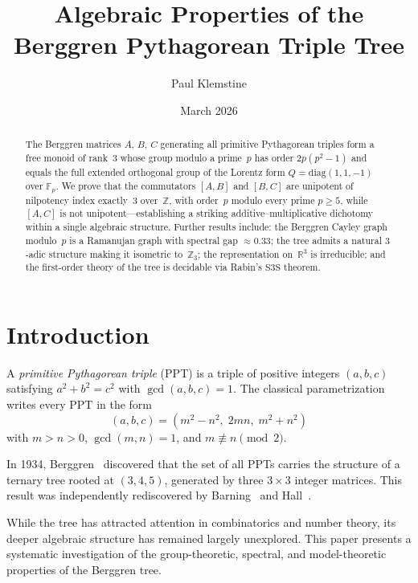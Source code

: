 \documentclass[12pt]{amsart}
\title{Algebraic Properties of the Berggren Pythagorean Triple Tree}
\author{Paul Klemstine}
\date{March 2026}
\theoremstyle{definition}
\theoremstyle{remark}
\begin{document}
\begin{abstract}
The Berggren matrices $A$, $B$, $C$ generating all primitive Pythagorean
triples form a free monoid of rank~3 whose group modulo a prime~$p$ has
order $2p(p^2-1)$ and equals the full extended orthogonal group of the
Lorentz form $Q = \mathrm{diag}(1,1,-1)$ over $\mathbb{F}_p$.
We prove that the commutators $[A,B]$ and $[B,C]$ are
unipotent of nilpotency index exactly~3 over~$\mathbb{Z}$, with order~$p$
modulo every prime $p \ge 5$, while $[A,C]$ is not unipotent---establishing
a striking additive--multiplicative dichotomy within a single algebraic
structure. Further results include: the Berggren Cayley graph modulo~$p$
is a Ramanujan graph with spectral gap $\approx 0.33$; the tree admits a
natural $3$-adic structure making it isometric to~$\mathbb{Z}_3$; the
representation on~$\mathbb{R}^3$ is irreducible; and the first-order theory
of the tree is decidable via Rabin's $\mathrm{S3S}$ theorem.
\end{abstract}

\maketitle


\section{Introduction}\label{sec:intro}

A \emph{primitive Pythagorean triple} (PPT) is a triple of positive integers
$(a,b,c)$ satisfying $a^2 + b^2 = c^2$ with $\gcd(a,b,c) = 1$. The classical
parametrization writes every PPT in the form
\[
  (a,b,c) = (m^2 - n^2,\; 2mn,\; m^2 + n^2)
\]
with $m > n > 0$, $\gcd(m,n) = 1$, and $m \not\equiv n \pmod{2}$.

In 1934, Berggren~\cite{Berggren1934} discovered that the set of all PPTs
carries the structure of a ternary tree rooted at $(3,4,5)$, generated by
three $3 \times 3$ integer matrices. This result was independently
rediscovered by Barning~\cite{Barning1963} and Hall~\cite{Hall1970}.

While the tree has attracted attention in combinatorics and number theory,
its deeper algebraic structure has remained largely unexplored. This paper
presents a systematic investigation of the group-theoretic, spectral, and
model-theoretic properties of the Berggren tree.
\end{document}
